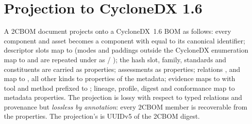 \documentclass[11pt,a4paper]{article}
\newcommand{\twocbom}{2CBOM}
\theoremstyle{definition}
\theoremstyle{plain}
\begin{document}
\section{Projection to CycloneDX 1.6}\label{sec:projection}
A \twocbom{} document projects onto a CycloneDX~1.6 BOM as follows: every component and asset
becomes a component with  equal to its canonical identifier; descriptor slots map to
 (modes and paddings outside the CycloneDX enumeration map to
 and are repeated under  as  /
); the hash slot, family, standards and constituents are carried as
 properties; assessments as  properties;
relations ,  and  map to , all other
kinds to  properties of the metadata; evidence maps to
 with tool and method prefixed to ; lineage,
profile, digest and conformance map to metadata properties. The projection is lossy with respect
to typed relations and provenance but \emph{lossless by annotation}: every \twocbom{} member is
recoverable from the properties. The projection's  is UUIDv5 of the
\twocbom{} digest.

\end{document}
